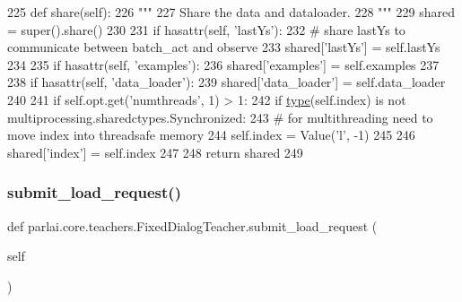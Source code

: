 \begin{DoxyCode}
225     \textcolor{keyword}{def }share(self):
226         \textcolor{stringliteral}{"""}
227 \textcolor{stringliteral}{        Share the data and dataloader.}
228 \textcolor{stringliteral}{        """}
229         shared = super().share()
230 
231         \textcolor{keywordflow}{if} hasattr(self, \textcolor{stringliteral}{'lastYs'}):
232             \textcolor{comment}{# share lastYs to communicate between batch\_act and observe}
233             shared[\textcolor{stringliteral}{'lastYs'}] = self.lastYs
234 
235         \textcolor{keywordflow}{if} hasattr(self, \textcolor{stringliteral}{'examples'}):
236             shared[\textcolor{stringliteral}{'examples'}] = self.examples
237 
238         \textcolor{keywordflow}{if} hasattr(self, \textcolor{stringliteral}{'data\_loader'}):
239             shared[\textcolor{stringliteral}{'data\_loader'}] = self.data\_loader
240 
241         \textcolor{keywordflow}{if} self.opt.get(\textcolor{stringliteral}{'numthreads'}, 1) > 1:
242             \textcolor{keywordflow}{if} \hyperlink{namespaceparlai_1_1agents_1_1tfidf__retriever_1_1build__tfidf_ad5dfae268e23f506da084a9efb72f619}{type}(self.index) \textcolor{keywordflow}{is} \textcolor{keywordflow}{not} multiprocessing.sharedctypes.Synchronized:
243                 \textcolor{comment}{# for multithreading need to move index into threadsafe memory}
244                 self.index = Value(\textcolor{stringliteral}{'l'}, -1)
245 
246         shared[\textcolor{stringliteral}{'index'}] = self.index
247 
248         \textcolor{keywordflow}{return} shared
249 
\end{DoxyCode}
\mbox{\label{classparlai_1_1core_1_1teachers_1_1FixedDialogTeacher_a8923ee1255939443c7a6ea1532a2fe40}} 
\subsubsection{\texorpdfstring{submit\+\_\+load\+\_\+request()}{submit\_load\_request()}}
{\footnotesize\ttfamily def parlai.\+core.\+teachers.\+Fixed\+Dialog\+Teacher.\+submit\+\_\+load\+\_\+request (\begin{DoxyParamCaption}\item[{}]{self }\end{DoxyParamCaption})}

